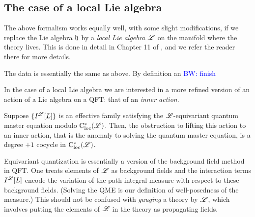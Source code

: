 \documentclass[10pt]{amsart}
\def\brian{\textcolor{blue}{BW: }\textcolor{blue}}
\begin{document}
\subsection{The case of a local Lie algebra}

The above formalism works equally well, with some slight modifications, if we replace the Lie algebra $\mathfrak h$ by a {\em local Lie algebra} $\mathscr L$ on the manifold where the theory lives.
This is done in detail in Chapter 11 of \cite{CG2}, and we refer the reader there for more details. 

The data is essentially the same as above.
By definition an \brian{finish}

In the case of a local Lie algebra we are interested in a more refined version of an action of a Lie algebra on a QFT: that of an {\em inner action}.


\begin{lem}\label{lem: innner action}
Suppose $\{I^{\mathscr L}[L]\}$ is an effective family satisfying the $\mathscr L$-equivariant quantum master equation modulo ${\rm C}_{\rm loc}^*(\mathscr L)$.
Then, the obstruction to lifting this action to an inner action, that is the anomaly to solving the quantum master equation, is a degree $+1$ cocycle in ${\rm C}_{\rm loc}^*(\mathscr L)$. 
\end{lem}


\begin{rmk}
Equivariant quantization is essentially a version of the background field method in QFT.
One treats elements of $\mathscr L$ as background fields and 
the interaction terms $I^\mathscr L[L]$ encode the variation of the path integral measure with respect to these background fields.
(Solving the QME is our definition of well-posedness of the measure.)
This should not be confused with {\em gauging} a theory by $\mathscr L$, which involves putting the elements of $\mathscr L$ in the theory as propagating fields.
\end{rmk}


%  

\end{document}
